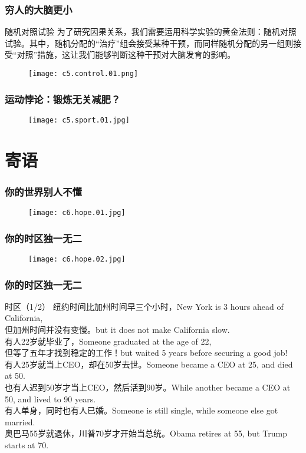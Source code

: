 \begin{frame}
  \frametitle{穷人的大脑更小}
  \begin{block}{随机对照试验}
为了研究因果关系，我们需要运用科学实验的黄金法则：随机对照试验。其中，随机分配的“治疗”组会接受某种干预，而同样随机分配的另一组则接受“对照”措施，这让我们能够判断这种干预对大脑发育的影响。
  \end{block}
  \begin{figure}
    \centering
    \texttt{[image: c5.control.01.png]}
  \end{figure}
\end{frame}

\begin{frame}
  \frametitle{运动悖论：锻炼无关减肥？}
  \begin{figure}
    \centering
    \texttt{[image: c5.sport.01.jpg]}
  \end{figure}
\end{frame}

\section{寄语}
\begin{frame}
  \frametitle{你的世界别人不懂}
  \begin{figure}
    \centering
    \texttt{[image: c6.hope.01.jpg]}
  \end{figure}
\end{frame}

\begin{frame}
  \frametitle{你的时区独一无二}
  \begin{figure}
    \centering
    \texttt{[image: c6.hope.02.jpg]}
  \end{figure}
\end{frame}

\begin{frame}
  \frametitle{你的时区独一无二}
  \begin{block}{时区（1/2）}
纽约时间比加州时间早三个小时，New York is 3 hours ahead of California,\\
但加州时间并没有变慢。but it does not make California slow.\\
有人22岁就毕业了，Someone graduated at the age of 22,\\
但等了五年才找到稳定的工作！but waited 5 years before securing a good job!\\
有人25岁就当上CEO，却在50岁去世。Someone became a CEO at 25, and died at 50.\\
也有人迟到50岁才当上CEO，然后活到90岁。While another became a CEO at 50, and lived to 90 years.\\
有人单身，同时也有人已婚。Someone is still single, while someone else got married.\\
奥巴马55岁就退休，川普70岁才开始当总统。Obama retires at 55, but Trump starts at 70.\\
  \end{block}
\end{frame}

